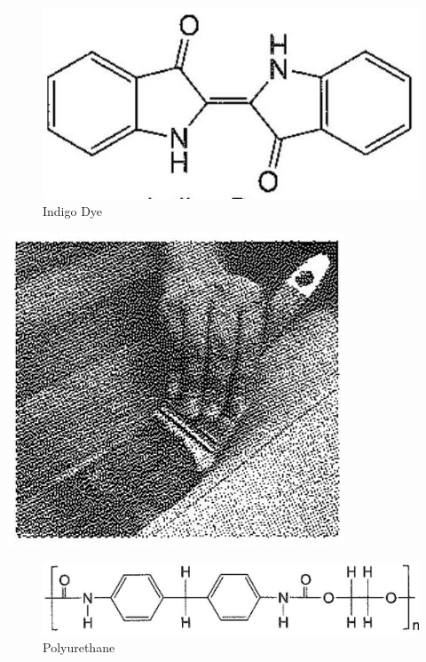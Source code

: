 \documentclass[10pt]{article}
\begin{document}
\begin{figure}[h]
\begin{center}
  \includegraphics[width=\textwidth]{2025_10_23_74efce88ce3a451fd6b0g-025(2)}
\captionsetup{labelformat=empty}
\caption{Indigo Dye}
\end{center}
\end{figure}

\begin{center}
\includegraphics[max width=\textwidth]{2025_10_23_74efce88ce3a451fd6b0g-025}
\end{center}

\begin{figure}[h]
\begin{center}
  \includegraphics[width=\textwidth]{2025_10_23_74efce88ce3a451fd6b0g-025(3)}
\captionsetup{labelformat=empty}
\caption{Polyurethane}
\end{center}
\end{figure}
\end{document}
